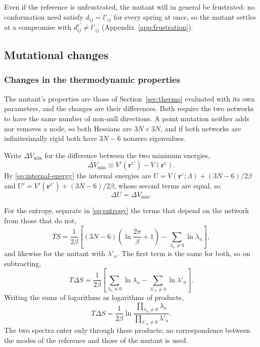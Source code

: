 \documentclass[11pt]{article}
\newcommand{\rr}{\mathbf{r}}
\newcommand{\LL}{\Lambda}
\newcommand{\re}{\rr^{e}}
\newcommand{\rem}{\rr^{e\prime}}   %
\newcommand{\dijem}{d^{e\prime}_{ij}}
\newcommand{\lijm}{l'_{ij}}
\newcommand{\dij}{d_{ij}}
\begin{document}
Even if the reference is unfrustrated, the mutant will in general be frustrated: no conformation need satisfy $\dij = \lijm$ for every spring at once, so the mutant settles at a compromise with $\dijem \ne \lijm$ (Appendix~\ref{app:frustration}).

\subsection{Mutational changes}
\label{sec:changes}

\subsubsection{Changes in the thermodynamic properties}

The mutant's properties are those of Section~\ref{sec:thermo} evaluated with its own parameters, and the changes are their differences.
Both require the two networks to have the same number of non-null directions.
A point mutation neither adds nor removes a node, so both Hessians are $3N\times3N$, and if both networks are infinitesimally rigid both have $3N-6$ nonzero eigenvalues.

Write $\Delta V_{\min}$ for the difference between the two minimum energies,
\begin{equation}
\Delta V_{\min} \equiv V'(\rem) - V(\re) .
\label{eq:minimum-energy-difference}
\end{equation}
By \eqref{eq:internal-energy} the internal energies are $U = V(\re;\LL) + (3N-6)/2\beta$ and $U' = V'(\rem) + (3N-6)/2\beta$, whose second terms are equal, so
\begin{equation}
\boxed{
\Delta U = \Delta V_{\min} .
}
\label{eq:internal-energy-change}
\end{equation}

For the entropy, separate in \eqref{eq:entropy} the terms that depend on the network from those that do not,
\begin{equation}
TS = \frac{1}{2\beta}\left[ (3N-6)\left(\ln\frac{2\pi}{\beta} + 1\right)
- \sum_{\lambda_n \ne 0} \ln \lambda_n \right],
\end{equation}
and likewise for the mutant with $\lambda'_n$.
The first term is the same for both, so on subtracting,
\begin{equation}
T \Delta S = \frac{1}{2\beta}\left[
\sum_{\lambda_n \ne 0} \ln \lambda_n - \sum_{\lambda'_n \ne 0} \ln \lambda'_n \right] .
\end{equation}
Writing the sums of logarithms as logarithms of products,
\begin{equation}
\boxed{
T \Delta S = \frac{1}{2\beta} \ln
\frac{\prod_{\lambda_n \ne 0} \lambda_n}{\prod_{\lambda'_n \ne 0} \lambda'_n} .
}
\label{eq:entropy-change}
\end{equation}
The two spectra enter only through these products; no correspondence between the modes of the reference and those of the mutant is used.
\end{document}
